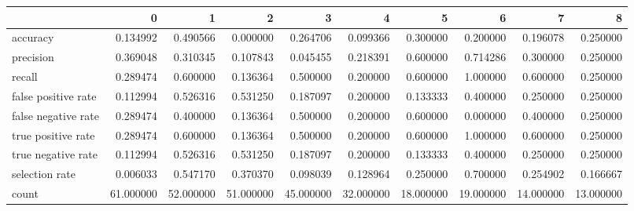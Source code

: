 \begin{tabular}{lrrrrrrrrr}
\toprule
{} &          0 &          1 &          2 &          3 &          4 &          5 &          6 &          7 &          8 \\
\midrule
accuracy            &   0.134992 &   0.490566 &   0.000000 &   0.264706 &   0.099366 &   0.300000 &   0.200000 &   0.196078 &   0.250000 \\
precision           &   0.369048 &   0.310345 &   0.107843 &   0.045455 &   0.218391 &   0.600000 &   0.714286 &   0.300000 &   0.250000 \\
recall              &   0.289474 &   0.600000 &   0.136364 &   0.500000 &   0.200000 &   0.600000 &   1.000000 &   0.600000 &   0.250000 \\
false positive rate &   0.112994 &   0.526316 &   0.531250 &   0.187097 &   0.200000 &   0.133333 &   0.400000 &   0.250000 &   0.250000 \\
false negative rate &   0.289474 &   0.400000 &   0.136364 &   0.500000 &   0.200000 &   0.600000 &   0.000000 &   0.400000 &   0.250000 \\
true positive rate  &   0.289474 &   0.600000 &   0.136364 &   0.500000 &   0.200000 &   0.600000 &   1.000000 &   0.600000 &   0.250000 \\
true negative rate  &   0.112994 &   0.526316 &   0.531250 &   0.187097 &   0.200000 &   0.133333 &   0.400000 &   0.250000 &   0.250000 \\
selection rate      &   0.006033 &   0.547170 &   0.370370 &   0.098039 &   0.128964 &   0.250000 &   0.700000 &   0.254902 &   0.166667 \\
count               &  61.000000 &  52.000000 &  51.000000 &  45.000000 &  32.000000 &  18.000000 &  19.000000 &  14.000000 &  13.000000 \\
\bottomrule
\end{tabular}
